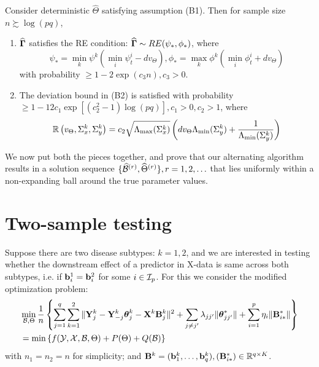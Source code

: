 \documentclass[12pt, letterpaper]{article}
\numberwithin{equation}{section}
\begin{document}
\begin{Proposition}\label{prop:ThmBetaRE}
Consider deterministic $\widehat \Theta$ satisfying assumption (B1). Then for sample size $n \succsim \log (pq)$,

\begin{enumerate}
%
\item %
$\widehat {{\boldsymbol{\Gamma}}}$ satisfies the RE condition: $ \widehat {{\boldsymbol{\Gamma}}} \sim RE (\psi_*, \phi_*)$, where 
%
$$
\psi_* = \min_k \psi^k \left( \min_i \psi_t^i - d v_\Theta \right), 
\phi_* = \max_k \phi^k \left( \min_i \phi_t^i + d v_\Theta \right)
$$
%
with probability $\geq 1 - 2 \exp(c_3 n), c_3>0$.
%
\item The deviation bound in (B2) is satisfied with probability $ \geq 1 - 12 c_1 \exp[ (c_2^2-1) \log (pq)], c_1>0, c_2>1$, where
$$
{\mathbb{R}} \left(v_\Theta, \Sigma_x^k, \Sigma_y^k \right) = c_2 \sqrt{\Lambda_{\max} (\Sigma_x^k)} \left( d v_\Theta \Lambda_{\min} (\Sigma_y^k) +
\frac{1}{\Lambda_{\min} (\Sigma_y^k) } \right)
$$
\end{enumerate} 
\end{Proposition}

We now put both the pieces together, and prove that our alternating algorithm results in a solution sequence $\{ \widehat {{\cal{B}}}^{(r)}, \widehat \Theta^{(r)} \}, r = 1, 2, \ldots$ that lies uniformly within a non-expanding ball around the true parameter values.


\section{Two-sample testing}
Suppose there are two disease subtypes: $k = 1,2$, and we are interested in testing whether the downstream effect of a predictor in X-data is same across both subtypes, i.e. if ${\bf{b}}_i^1 = {\bf{b}}_i^2$ for some $i \in {\cal{I}}_p$. For this we consider the modified optimization problem:
%
\begin{align}
& \min_{{\cal{B}}, \Theta} \frac{1}{n} \left\{ \sum_{j=1}^q \sum_{k=1}^2 \| {\mathbf{Y}}_j^k - {\mathbf{Y}}_{-j}^k {\boldsymbol{\theta}}_j^k - {\mathbf{X}}^k {\mathbf{B}}_{j}^k \|^2 + \sum_{j \neq j'} \lambda_{jj'} \| {\boldsymbol{\theta}}_{jj'}^* \| + \sum_{i=1}^p \eta_i \| {\mathbf{B}}_{i*}^* \| \right\} \notag\\
&= \min \left\{ f ( {\cal{Y}}, {\cal{X}}, {\cal{B}}, \Theta) + P (\Theta) + Q ({\cal{B}}) \right\} 
\end{align}
%
with $n_1 = n_2 = n$ for simplicity; and ${\mathbf{B}}^k = ({\bf{b}}_1^k, \ldots, {\bf{b}}_q^k), ({\mathbf{B}}_{i*}^*) \in {\mathbb{R}}^{ q \times K}$.
\end{document}
